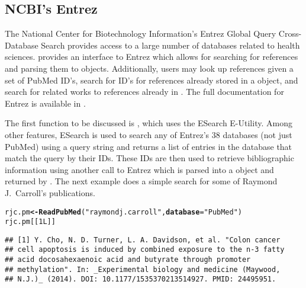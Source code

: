 \documentclass[article]{jss}\usepackage[]{graphicx}\usepackage[]{color}
\makeatletter
\newcommand{\hlnum}[1]{\textcolor[rgb]{0.125,0.125,1}{#1}}%
\newcommand{\hlstr}[1]{\textcolor[rgb]{0.125,0.125,1}{#1}}%
\newcommand{\hlstd}[1]{\textcolor[rgb]{0.251,0.251,0.282}{#1}}%
\newcommand{\hlkwb}[1]{\textcolor[rgb]{0.439,0.251,1}{\textbf{#1}}}%
\newcommand{\hlkwc}[1]{\textcolor[rgb]{0.529,0,0.184}{\textbf{#1}}}%
\newcommand{\hlkwd}[1]{\textcolor[rgb]{0.251,0.251,0.282}{\textbf{#1}}}%
\newenvironment{kframe}{%
 \def\at@end@of@kframe{}%
 \ifinner\ifhmode%
  \def\at@end@of@kframe{\end{minipage}}%
  \begin{minipage}{\columnwidth}%
 \fi\fi%
 \def\FrameCommand##1{\hskip\@totalleftmargin \hskip-\fboxsep
 \colorbox{shadecolor}{##1}\hskip-\fboxsep
     \hskip-\linewidth \hskip-\@totalleftmargin \hskip\columnwidth}%
 \MakeFramed {\advance\hsize-\width
   \@totalleftmargin\z@ \linewidth\hsize
   \@setminipage}}%
 {\par\unskip\endMakeFramed%
 \at@end@of@kframe}
\newenvironment{knitrout}{}{} %
\newcommand{\ourpkg}{\pkg{RefManageR}}
\makeatother
\begin{document}
\subsection{NCBI's Entrez}
The National Center for Biotechnology Information's Entrez Global Query Cross-Database Search provides access to a large number of databases related to health sciences. \ourpkg{} provides an interface to Entrez which allows for searching for references and parsing them to  objects.  Additionally, users may look up references given a set of PubMed ID's, search for ID's for references already stored in a  object, and search for related works to references already in \R{}.  The full documentation for Entrez is available in \citet{entrez}.

The first \ourpkg{} function to be discussed is , which uses the ESearch E-Utility.  Among other features, ESearch is used to search any of Entrez's 38 databases (not just PubMed) using a query string and returns a list of entries in the database that match the query by their IDs. These IDs are then used to retrieve bibliographic information using another call to Entrez which is parsed into a  object and returned by .  The next example does a simple search for some of Raymond J.\ Carroll's publications.
\begin{knitrout}
\color{fgcolor}\begin{kframe}
\begin{alltt}
\hlstd{rjc.pm} \hlkwb{<-} \hlkwd{ReadPubMed}\hlstd{(}\hlstr{"raymond j. carroll"}\hlstd{,} \hlkwc{database} \hlstd{=} \hlstr{"PubMed"}\hlstd{)}
\hlstd{rjc.pm[[}\hlnum{1L}\hlstd{]]}
\end{alltt}
\begin{verbatim}
## [1] Y. Cho, N. D. Turner, L. A. Davidson, et al. "Colon cancer
## cell apoptosis is induced by combined exposure to the n-3 fatty
## acid docosahexaenoic acid and butyrate through promoter
## methylation". In: _Experimental biology and medicine (Maywood,
## N.J.)_ (2014). DOI: 10.1177/1535370213514927. PMID: 24495951.
\end{verbatim}
\end{kframe}
\end{knitrout}
\end{document}
